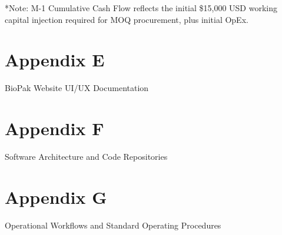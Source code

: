 \documentclass[12pt,a4paper]{article}
\begin{document}
*Note: M-1 Cumulative Cash Flow reflects the initial \$15,000 USD working capital injection required for MOQ procurement, plus initial OpEx.

\section*{Appendix E}

BioPak Website UI/UX Documentation

\section*{Appendix F}

Software Architecture and Code Repositories

\section*{Appendix G}

Operational Workflows and Standard Operating Procedures
\end{document}
